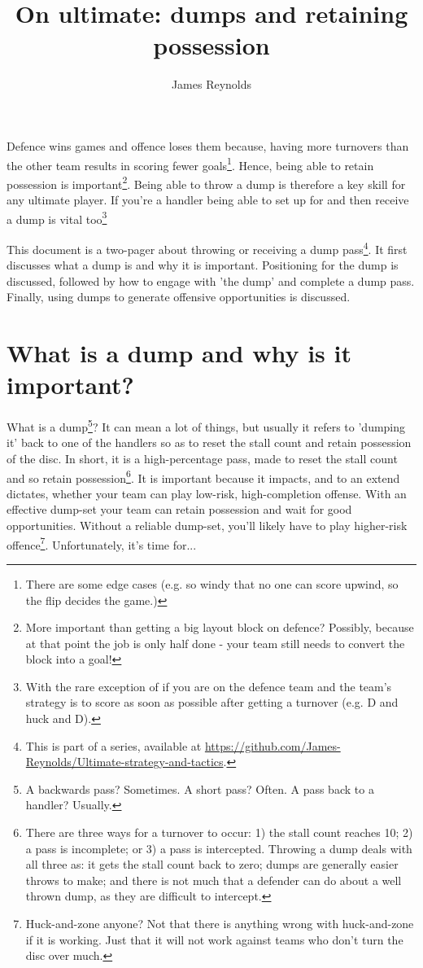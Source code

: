\documentclass{tufte-handout}
\title{On ultimate: dumps and retaining possession}
\author[James Reynolds]{James Reynolds}
\begin{document}
\maketitle%




Defence wins games 
and offence loses them 
because,   
having more turnovers 
than the other team 
results in
scoring fewer goals\footnote{
There are 
some edge cases 
(e.g. so windy that 
no one can score 
upwind, so the
flip decides the game.)}. 
Hence, 
being able 
to retain possession 
is important\footnote{
More important than getting 
a big layout block on 
defence? Possibly, 
because at that point 
the job 
is only half done - 
your team still 
needs to convert 
the block into a goal!}. 
Being able 
to throw a dump 
is therefore a 
key skill for any
ultimate player. 
If you're a handler 
being able to 
set up for 
and then receive a dump 
is vital too\footnote{
With the rare exception of 
if you are on the defence team 
and the team's strategy is to 
score as soon as possible 
after getting a turnover 
(e.g. D and huck and D).}


This document is  
a two-pager about 
throwing or 
receiving a dump pass\footnote{
This
is part of a series, 
available at
\url{https://github.com/James-Reynolds/Ultimate-strategy-and-tactics}.}. 
It first discusses 
what a dump is 
and why it is important. 
Positioning for the dump 
is discussed, 
followed by how to 
engage with 'the dump'
and complete a dump pass. 
Finally, using 
dumps to generate 
offensive opportunities 
is discussed. 

\section{What is a dump and why is it important?}\label{sec:what_is_a_dump}
What is a dump\footnote{
A backwards pass? 
Sometimes.  
A short pass? 
Often. 
A pass back to a handler? 
Usually.}? 
It can mean a lot of things, 
but usually 
it refers to 
'dumping it' 
back to one of the handlers 
so as to 
reset the stall count 
and retain possession 
of the disc.  
In short,
it is 
a high-percentage 
pass, 
made to reset 
the stall count 
and so retain possession\footnote{
There are three ways 
for a turnover to occur:
1) the stall count reaches 10; 
2) a pass is incomplete; or
3) a pass is intercepted. 
Throwing a dump deals 
with all three as:
it gets the stall count back to zero; 
dumps are 
generally easier throws 
to make; and 
there is not much that a defender 
can do about a well thrown dump, 
as they are difficult to intercept. }.  
It is important because 
it impacts, 
and to an extend dictates, 
whether your team can 
play low-risk, high-completion 
offense. 
With an effective dump-set 
your team can retain possession
and wait for  
good opportunities.  
Without a reliable dump-set, 
you'll likely 
have to play higher-risk 
offence\footnote{
Huck-and-zone anyone? 
Not that there is anything 
wrong with huck-and-zone 
if it is working. 
Just that it 
will not 
work against teams
who don't turn the disc over much.}.  
Unfortunately, it's time for...
\end{document}
